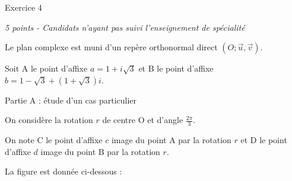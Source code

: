
%
\begin{h2}Exercice 4\end{h2}
\textit{5 points - Candidats n'ayant pas suivi l'enseignement de spécialité }
\par
Le plan complexe est muni d'un repère orthonormal direct $\left(O; \vec{u}, \vec{v}\right)$.
\par
Soit A le point d'affixe $a=1+i\sqrt{3}$ et B le point d'affixe $b=1-\sqrt{3}+\left(1+\sqrt{3}\right)i$.
\begin{h3}Partie A : étude d'un cas particulier\end{h3}
On considère la rotation $r$ de centre O et d'angle $\frac{2\pi }{3}$.
\par
On note C le point d'affixe $c$ image du point A par la rotation $r$ et D le point d'affixe $d$ image du point B par la rotation $r$.
\par
La figure est donnée ci-dessous :


